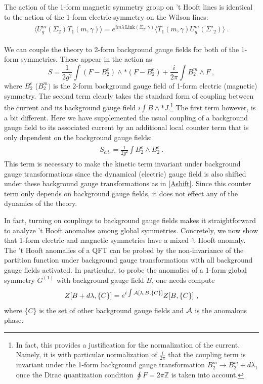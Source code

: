 \documentclass[11pt]{article}
\newcommand{\eq}[1]{\begin{align}\begin{split}#1\end{split}\end{align}}
\def\CA{{\cal A}}
\def\IZ{{\mathbb{Z}}}
\def\beq{\begin{equation}}
\def\eeq{\end{equation}}
\begin{document}
The action of the 1-form magnetic symmetry group on 't Hooft lines is identical to the action of the 1-form electric symmetry on the Wilson lines:
%
\eq{\label{eq:1-form magnetic_linking}
\big\langle U^m_g(\Sigma_{2})T_1(m, \gamma)\big\rangle=e^{i   m \lambda\, \text{Link} (\Sigma_2, \gamma)} \big\langle T_1 (m, \gamma)  U^m_g(\Sigma'_{2})\big\rangle~.
}

We can couple the theory to 2-form background gauge fields for both of the 1-form symmetries. These appear in the action as
%
\beq
S = \frac{1}{2g^2} \int \left( F - B_2^e \right) \wedge \ast  \left( F - B_2^e \right) + \frac{i}{2\pi} \int B_2^m \wedge F~,
\label{eq:Maxwell_with_BGF}
\eeq
%
 where $B_2^e$ ($B_2^m)$ is the 2-form background gauge field of 1-form electric (magnetic) symmetry. The second term clearly takes the standard form of coupling between the current and its background gauge field $i\int B \wedge \ast  J$.\footnote{In fact, this provides a justification for the normalization of the current. Namely, it is with particular normalization of $\frac{i}{2\pi}$ that the coupling term is invariant under the 1-form background gauge transformation $B_2^m \to B_2^m + d \lambda_1$ once the Dirac quantization condition $\oint F = 2\pi \IZ$ is taken into account. } The first term however, is a bit different. Here we have supplemented the usual coupling of a background gauge field to its associated current by an additional local counter term that is only dependent on the background gauge fields: 
 \eq{
 S_{c.t.}=\frac{1}{2g^2}\int B_2^e\wedge B_2^e~.
}
This term is necessary to make the kinetic term invariant under background gauge transformations since the dynamical (electric) gauge field is also shifted under these background gauge transformations as in \eqref{Ashift}. Since this counter term only depends on background gauge fields, it does not effect any of the dynamics of the theory. 

In fact, turning on couplings to background gauge fields makes it straightforward to analyze 't Hooft anomalies among global symmetries. Concretely, we now show that 1-form electric and magnetic symmetries have a mixed 't Hooft anomaly. The 't Hooft anomalies of a QFT can be probed by the non-invariance of the partition function under background gauge transformations with all  background gauge fields activated. In particular, to probe the anomalies of a 1-form global symmetry $G^{(1)}$ with background gauge field $B$, one needs compute 
%
\beq
Z [ B + d \lambda, \lbrace C \rbrace ] = e^{i \int \CA [\lambda, B, \lbrace C \rbrace ]} Z [ B , \lbrace C \rbrace ]~,
\eeq
%
where $\lbrace C \rbrace$ is the set of other background gauge fields and $\CA$ is  the anomalous phase.
\end{document}
